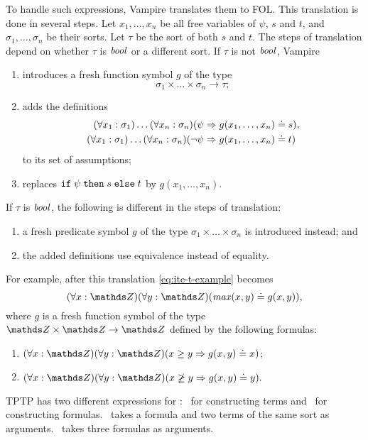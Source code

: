 To handle such expressions, Vampire translates them to FOL. This translation is done in several steps. Let $x_1,\ldots,x_n$ be all free variables of $\psi$, $s$ and $t$, and $\sigma_1,\ldots,\sigma_n$ be their sorts. Let $\tau$ be the sort of both $s$ and $t$. The steps of translation depend on whether $\tau$ is $\mathit{bool}$ or a different sort. If $\tau$ is not $\mathit{bool}$, Vampire
\begin{enumerate}
  \item introduces a fresh function symbol $g$ of the type $$\sigma_1 \times \ldots \times \sigma_n \to \tau;$$
  \item adds the definitions
\begin{equation*}
\begin{aligned}
(\forall x_1:\sigma_1)\ldots(\forall x_n:\sigma_n) (\psi &\Rightarrow g(x_1,\ldots,x_n) \doteq s),\\
(\forall x_1:\sigma_1)\ldots(\forall x_n:\sigma_n) (\neg\psi &\Rightarrow g(x_1,\ldots,x_n) \doteq t)
\end{aligned}
\end{equation*} to its set of assumptions;
  \item replaces $\mathtt{if}\;{\psi}\;\allowbreak\mathtt{then}\;{s}\;\allowbreak\mathtt{else}\;{t}$ by $g(x_1,\ldots,x_n)$.
\end{enumerate}

If $\tau$ is $\mathit{bool}$, the following is different in the steps of translation:
\begin{enumerate}
  \item a fresh predicate symbol $g$ of the type $\sigma_1 \times \ldots \times \sigma_n$ is introduced instead; and
  \item the added definitions use equivalence instead of equality.
\end{enumerate}
\noindent
For example, after this translation \eqref{eq:ite-t-example} becomes $$(\forall x:\Z)(\forall y:\Z)(\mathit{max}(x, y) \eql g(x, y)),$$ where $g$ is a fresh function symbol of the type $\Z \times \Z \to \Z$ defined by the following formulas:
\begin{enumerate}
  \item $(\forall x:\Z)(\forall y:\Z)(x \geq y \implies g(x, y) \eql x)$;
  \item $(\forall x:\Z)(\forall y:\Z)(x \not\geq y \implies g(x, y) \eql y).$
\end{enumerate}

TPTP has two different expressions for \ITE: \ditet\ for constructing terms and \ditef\ for constructing formulas. \ditet\ takes a formula and two terms of the same sort as arguments. \ditef\ takes three formulas as arguments.

